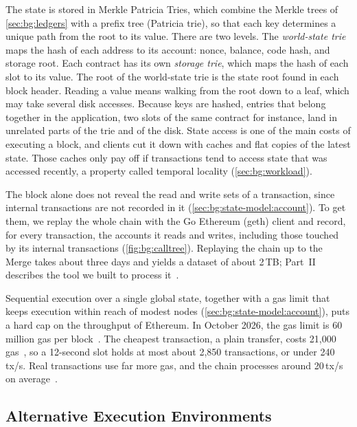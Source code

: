 The state is stored in Merkle Patricia Tries, which combine the Merkle trees of \autoref{sec:bg:ledgers} with a prefix tree (Patricia trie), so that each key determines a unique path from the root to its value.
There are two levels.
The \emph{world-state trie} maps the hash of each address to its account: nonce, balance, code hash, and storage root.
Each contract has its own \emph{storage trie}, which maps the hash of each slot to its value.
The root of the world-state trie is the state root found in each block header.
Reading a value means walking from the root down to a leaf, which may take several disk accesses.
Because keys are hashed, entries that belong together in the application, two slots of the same contract for instance, land in unrelated parts of the trie and of the disk.
State access is one of the main costs of executing a block, and clients cut it down with caches and flat copies of the latest state.
Those caches only pay off if transactions tend to access state that was accessed recently, a property called temporal locality (\autoref{sec:bg:workload}).

The block alone does not reveal the read and write sets of a transaction, since internal transactions are not recorded in it (\autoref{sec:bg:state-model:account}).
To get them, we replay the whole chain with the Go Ethereum (geth) client and record, for every transaction, the accounts it reads and writes, including those touched by its internal transactions (\autoref{fig:bg:calltree}).
Replaying the chain up to the Merge takes about three days and yields a dataset of about 2\,TB; Part~II describes the tool we built to process it~\cite{pigaglio2023exploring}.

Sequential execution over a single global state, together with a gas limit that keeps execution within reach of modest nodes (\autoref{sec:bg:state-model:account}), puts a hard cap on the throughput of Ethereum.
In October 2026, the gas limit is 60 million gas per block~\cite{etherscangaslimit}. 
The cheapest transaction, a plain transfer, costs 21{,}000 gas~\cite{wood2014ethereum}, so a 12-second slot holds at most about 2{,}850 transactions, or under 240\,tx/s.
Real transactions use far more gas, and the chain processes around 20\,tx/s on average~\cite{etherscantx}.

\subsection{Alternative Execution Environments}\label{sec:bg:execution:alternatives}


